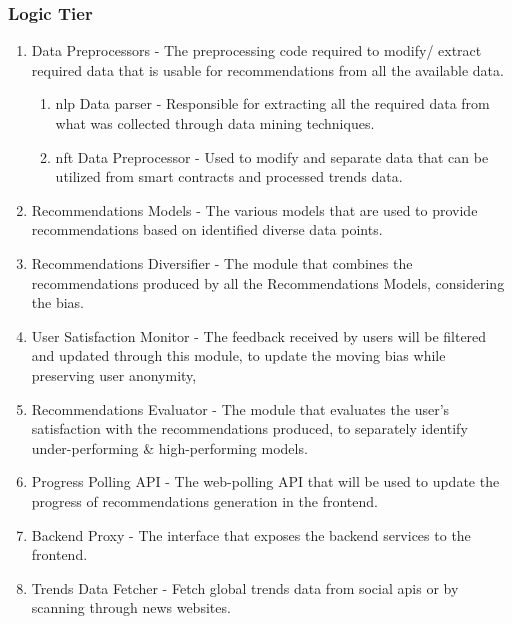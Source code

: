 \subsubsection{Logic Tier}
\begin{enumerate}
    \item Data Preprocessors - The preprocessing code required to modify/ extract required data that is usable for recommendations from all the available data.
    \begin{enumerate}
        \item \gls{nlp} Data parser - Responsible for extracting all the required data from what was collected through data mining techniques.
        \item \gls{nft} Data Preprocessor - Used to modify and separate data that can be utilized from smart contracts and processed trends data.
    \end{enumerate}
    \item Recommendations Models - The various models that are used to provide recommendations based on identified diverse data points.
    \item Recommendations Diversifier - The module that combines the recommendations produced by all the Recommendations Models, considering the bias.
    \item User Satisfaction Monitor - The feedback received by users will be filtered and updated through this module, to update the moving bias while preserving user anonymity,
    \item Recommendations Evaluator - The module that evaluates the user's satisfaction with the recommendations produced, to separately identify under-performing \& high-performing models.
    \item Progress Polling API - The web-polling API that will be used to update the progress of recommendations generation in the frontend.
    \item Backend Proxy - The interface that exposes the backend services to the frontend.
    \item Trends Data Fetcher - Fetch global trends data from social \gls{api}s or by scanning through news websites.
\end{enumerate}

